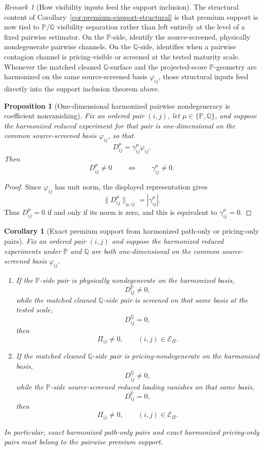 \documentclass[11pt,a4paper]{amsart}
\theoremstyle{plain}
\newtheorem{proposition}[theorem]{Proposition}
\newtheorem{corollary}[theorem]{Corollary}
\theoremstyle{definition}
\theoremstyle{remark}
\newtheorem{remark}[theorem]{Remark}
\newcommand{\PP}{\mathbb{P}}
\newcommand{\QQ}{\mathbb{Q}}
\newcommand{\cE}{\mathcal{E}}
\begin{document}
\begin{remark}[How visibility inputs feed the support inclusion]\label{rem:premium-support-trilogy}
The structural content of Corollary~\ref{cor:premium-support-structural} is that premium support
is now tied to \(\PP/\QQ\) visibility separation rather than left entirely at the level of a fixed
pairwise estimator.  On the \(\PP\)-side, \cite{vidal2026econometric,vidal2026market} identify the
source-screened, physically nondegenerate pairwise channels.  On the \(\QQ\)-side,
\cite{vidal2026latent} identifies when a pairwise contagion channel is pricing-visible or screened
at the tested maturity scale.  Whenever the matched cleaned \(\QQ\)-surface and the projected-score
\(\PP\)-geometry are harmonized on the same source-screened basis \(\varphi_{ij}\), those structural
inputs feed directly into the support inclusion theorem above.
\end{remark}

\begin{proposition}[One-dimensional harmonized pairwise nondegeneracy is coefficient nonvanishing]\label{prop:premium-coeff-nonzero}
Fix an ordered pair \((i,j)\), let \(\mu\in\{\PP,\QQ\}\), and suppose the harmonized reduced
experiment for that pair is one-dimensional on the common source-screened basis \(\varphi_{ij}\),
so that
\[
        D_{ij}^\mu=\gamma_{ij}^\mu \varphi_{ij}.
\]
Then
\[
        D_{ij}^\mu\neq0
        \qquad\Longleftrightarrow\qquad
        \gamma_{ij}^\mu\neq0.
\]
\end{proposition}

\begin{proof}
Since \(\varphi_{ij}\) has unit norm, the displayed representation gives
\[
        \|D_{ij}^\mu\|_{\mu,ij}=|\gamma_{ij}^\mu|.
\]
Thus \(D_{ij}^\mu=0\) if and only if its norm is zero, and this is equivalent to
\(\gamma_{ij}^\mu=0\).
\end{proof}

\begin{corollary}[Exact premium support from harmonized path-only or pricing-only pairs]\label{cor:premium-support-exact}
Fix an ordered pair \((i,j)\) and suppose the harmonized reduced experiments under \(\PP\) and
\(\QQ\) are both one-dimensional on the common source-screened basis \(\varphi_{ij}\).
\begin{enumerate}[label=(\roman*)]
\item If the \(\PP\)-side pair is physically nondegenerate on the harmonized basis,
\[
        D_{ij}^\PP\neq0,
\]
while the matched cleaned \(\QQ\)-side pair is screened on that same basis at the tested scale,
\[
        D_{ij}^\QQ=0,
\]
then
\[
        \Pi_{ij}\neq0,
        \qquad
        (i,j)\in\cE_\Pi.
\]
\item If the matched cleaned \(\QQ\)-side pair is pricing-nondegenerate on the harmonized basis,
\[
        D_{ij}^\QQ\neq0,
\]
while the \(\PP\)-side source-screened reduced loading vanishes on that same basis,
\[
        D_{ij}^\PP=0,
\]
then
\[
        \Pi_{ij}\neq0,
        \qquad
        (i,j)\in\cE_\Pi.
\]
\end{enumerate}
In particular, exact harmonized path-only pairs and exact harmonized pricing-only pairs must belong
to the pairwise premium support.
\end{corollary}
\end{document}
